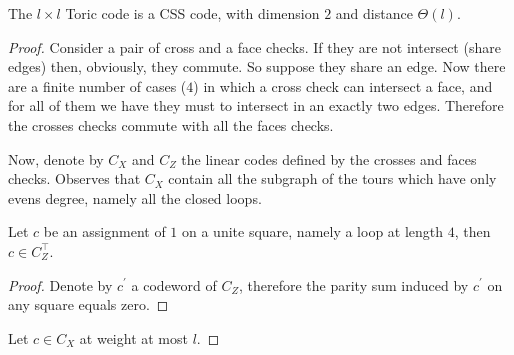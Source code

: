 \begin{claim}
  The $l \times l$  Toric code is a CSS code, with dimension $2$ and distance $\Theta\left( l \right)$.   
\end{claim}
\begin{proof}
  Consider a pair of cross and a face checks. If they are not intersect (share edges) then, obviously, they commute. So suppose they share an edge. Now there are a finite number of cases ($4$) in which a cross check can intersect a face, and for all of them we have they must to intersect in an exactly two edges. Therefore the crosses checks commute with all the faces checks. 

  Now, denote by $C_{X}$ and $C_{Z}$ the linear codes defined by the crosses and faces checks. Observes that $C_{X}$ contain all the subgraph of the tours which have only evens degree, namely all the closed loops. 
  \begin{claim}
    Let $c$ be an assignment of $1$ on a unite square, namely a loop at length $4$, then $c \in C_{Z}^{\top}$.  
  \end{claim}
  \begin{proof}
    Denote by $c^{\prime}$ a codeword of $C_{Z}$, therefore the parity sum induced by $c^{\prime}$ on any square equals zero. 
  \end{proof}
  Let $c \in C_{X}$ at weight at most $l$.     
\end{proof}

%
%    

